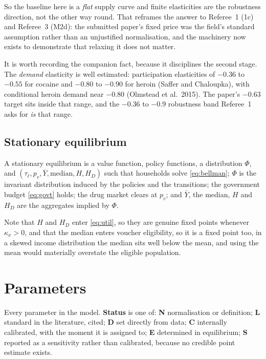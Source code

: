 \documentclass[11pt]{article}
\begin{document}
So the baseline here is a \emph{flat} supply curve and finite elasticities are
the robustness direction, not the other way round. That reframes the answer to
Referee~1 (1c) and Referee~3 (M2d): the submitted paper's fixed price was the
field's standard assumption rather than an unjustified normalisation, and the
machinery now exists to demonstrate that relaxing it does not matter.

It is worth recording the companion fact, because it disciplines the second
stage. The \emph{demand} elasticity is well estimated: participation elasticities
of $-0.36$ to $-0.55$ for cocaine and $-0.80$ to $-0.90$ for heroin
(Saffer and Chaloupka), with conditional heroin demand near $-0.80$ (Olmstead et
al.\ 2015). The paper's $-0.63$ target sits inside that range, and the $-0.36$ to
$-0.9$ robustness band Referee~1 asks for \emph{is} that range.

\subsection{Stationary equilibrium}

A stationary equilibrium is a value function, policy functions, a distribution
$\Phi$, and $(\tau_{\ell},p_v,\bar Y,\text{median},H,H_D)$ such that households
solve \eqref{eq:bellman}; $\Phi$ is the invariant distribution induced by the
policies and the transitions; the government budget \eqref{eq:govt} holds; the
drug market clears at $p_v$; and $\bar Y$, the median, $H$ and $H_D$ are the
aggregates implied by $\Phi$.

Note that $H$ and $H_D$ enter \eqref{eq:util}, so they are genuine fixed points
whenever $\kappa_x>0$, and that the median enters voucher eligibility, so it is a
fixed point too, in a skewed income distribution the median sits well below
the mean, and using the mean would materially overstate the eligible population.

\section{Parameters}
\label{sec:params}

Every parameter in the model. \textbf{Status} is one of: \textbf{N} normalisation
or definition; \textbf{L} standard in the literature, cited; \textbf{D} set
directly from data; \textbf{C} internally calibrated, with the moment it is
assigned to; \textbf{E} determined in equilibrium; \textbf{S} reported as a
sensitivity rather than calibrated, because no credible point estimate exists.
\end{document}
